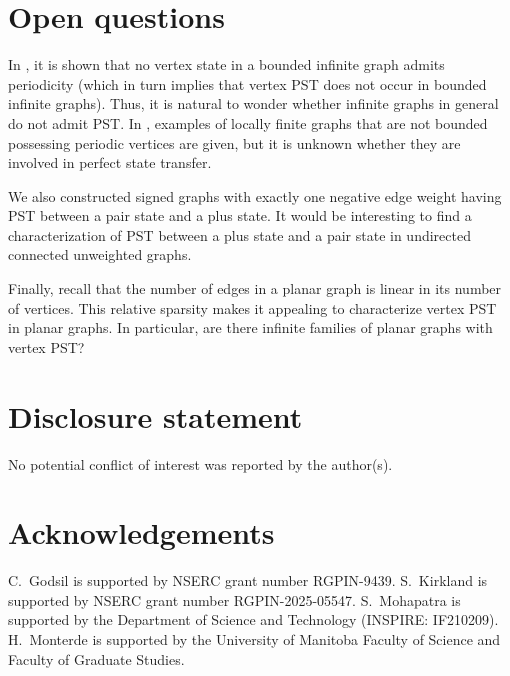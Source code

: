 \documentclass[12pt,a4paper]{article}
\newtheorem{cor}{Corollary}
\begin{document}

\section{Open questions}
\label{oq}

In \cite[Theorem 5.6]{godd}, it is shown that no vertex state in a bounded infinite graph admits periodicity (which in turn implies that vertex PST does not occur in bounded infinite graphs). Thus, it is natural to wonder whether infinite graphs in general do not admit PST. In \cite{godd}, examples of locally finite graphs that are not bounded possessing periodic vertices are given, but it is unknown whether they are involved in perfect state transfer.

We also constructed signed graphs with exactly one negative edge weight having PST between a pair state and a plus state. It would be interesting to find a characterization of PST between a plus state and a pair state in undirected connected unweighted graphs.

Finally, recall that the number of edges in a planar graph is linear in its number of vertices. This relative sparsity makes it appealing to characterize vertex PST in planar graphs. %
In particular, are there infinite families of planar graphs with vertex PST?

\section*{Disclosure statement}
No potential conflict of interest was reported by the author(s).
 
\section*{Acknowledgements} 
C.\ Godsil is supported by NSERC grant number RGPIN-9439. S.\ Kirkland is supported by NSERC grant number RGPIN-2025-05547. S.\ Mohapatra is supported by the Department of Science and Technology (INSPIRE: IF210209). H.\ Monterde is supported by the University of Manitoba Faculty of Science and Faculty of Graduate Studies.




\end{document}
